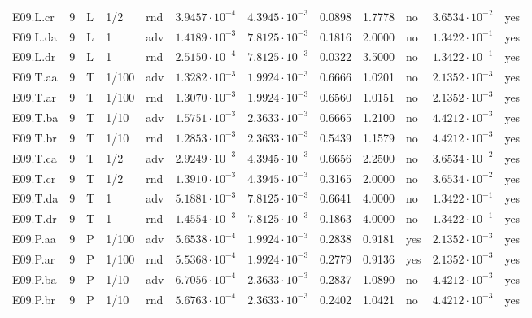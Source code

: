 {\begin{longtable}{@{}lllllllllll l@{}}
E09.L.cr & 9 & L & 1/2 & rnd & $3.9457\cdot 10^{-4}$ & $4.3945\cdot 10^{-3}$ & 0.0898 & 1.7778 & no & $3.6534\cdot 10^{-2}$ & yes \\
E09.L.da & 9 & L & 1 & adv & $1.4189\cdot 10^{-3}$ & $7.8125\cdot 10^{-3}$ & 0.1816 & 2.0000 & no & $1.3422\cdot 10^{-1}$ & yes \\
E09.L.dr & 9 & L & 1 & rnd & $2.5150\cdot 10^{-4}$ & $7.8125\cdot 10^{-3}$ & 0.0322 & 3.5000 & no & $1.3422\cdot 10^{-1}$ & yes \\
E09.T.aa & 9 & T & 1/100 & adv & $1.3282\cdot 10^{-3}$ & $1.9924\cdot 10^{-3}$ & 0.6666 & 1.0201 & no & $2.1352\cdot 10^{-3}$ & yes \\
E09.T.ar & 9 & T & 1/100 & rnd & $1.3070\cdot 10^{-3}$ & $1.9924\cdot 10^{-3}$ & 0.6560 & 1.0151 & no & $2.1352\cdot 10^{-3}$ & yes \\
E09.T.ba & 9 & T & 1/10 & adv & $1.5751\cdot 10^{-3}$ & $2.3633\cdot 10^{-3}$ & 0.6665 & 1.2100 & no & $4.4212\cdot 10^{-3}$ & yes \\
E09.T.br & 9 & T & 1/10 & rnd & $1.2853\cdot 10^{-3}$ & $2.3633\cdot 10^{-3}$ & 0.5439 & 1.1579 & no & $4.4212\cdot 10^{-3}$ & yes \\
E09.T.ca & 9 & T & 1/2 & adv & $2.9249\cdot 10^{-3}$ & $4.3945\cdot 10^{-3}$ & 0.6656 & 2.2500 & no & $3.6534\cdot 10^{-2}$ & yes \\
E09.T.cr & 9 & T & 1/2 & rnd & $1.3910\cdot 10^{-3}$ & $4.3945\cdot 10^{-3}$ & 0.3165 & 2.0000 & no & $3.6534\cdot 10^{-2}$ & yes \\
E09.T.da & 9 & T & 1 & adv & $5.1881\cdot 10^{-3}$ & $7.8125\cdot 10^{-3}$ & 0.6641 & 4.0000 & no & $1.3422\cdot 10^{-1}$ & yes \\
E09.T.dr & 9 & T & 1 & rnd & $1.4554\cdot 10^{-3}$ & $7.8125\cdot 10^{-3}$ & 0.1863 & 4.0000 & no & $1.3422\cdot 10^{-1}$ & yes \\
E09.P.aa & 9 & P & 1/100 & adv & $5.6538\cdot 10^{-4}$ & $1.9924\cdot 10^{-3}$ & 0.2838 & 0.9181 & yes & $2.1352\cdot 10^{-3}$ & yes \\
E09.P.ar & 9 & P & 1/100 & rnd & $5.5368\cdot 10^{-4}$ & $1.9924\cdot 10^{-3}$ & 0.2779 & 0.9136 & yes & $2.1352\cdot 10^{-3}$ & yes \\
E09.P.ba & 9 & P & 1/10 & adv & $6.7056\cdot 10^{-4}$ & $2.3633\cdot 10^{-3}$ & 0.2837 & 1.0890 & no & $4.4212\cdot 10^{-3}$ & yes \\
E09.P.br & 9 & P & 1/10 & rnd & $5.6763\cdot 10^{-4}$ & $2.3633\cdot 10^{-3}$ & 0.2402 & 1.0421 & no & $4.4212\cdot 10^{-3}$ & yes \\

\end{longtable}}
